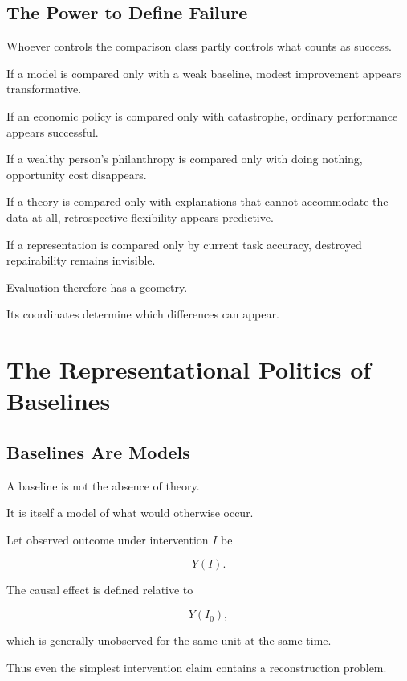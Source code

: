 \documentclass[11pt]{article}
\theoremstyle{remark}
\begin{document}
\subsection{The Power to Define Failure}

Whoever controls the comparison class partly controls what counts as success.

If a model is compared only with a weak baseline, modest improvement appears transformative.

If an economic policy is compared only with catastrophe, ordinary performance appears successful.

If a wealthy person's philanthropy is compared only with doing nothing, opportunity cost disappears.

If a theory is compared only with explanations that cannot accommodate the data at all, retrospective flexibility appears predictive.

If a representation is compared only by current task accuracy, destroyed repairability remains invisible.

Evaluation therefore has a geometry.

Its coordinates determine which differences can appear.

\section{The Representational Politics of Baselines}

\subsection{Baselines Are Models}

A baseline is not the absence of theory.

It is itself a model of what would otherwise occur.

Let observed outcome under intervention $I$ be

\begin{equation}
Y(I).
\end{equation}

The causal effect is defined relative to

\begin{equation}
Y(I_0),
\end{equation}

which is generally unobserved for the same unit at the same time.

Thus even the simplest intervention claim contains a reconstruction problem.
\end{document}
